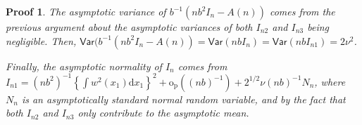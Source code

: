 \documentclass{article}
\newtheorem{Proof}{Proof}[section]
\begin{document}
\begin{Proof}
    The asymptotic variance of $b^{-1} (nb^2 I_n - A(n))$ comes from the previous argument about the asymptotic variances of both $I_{n2}$ and $I_{n3}$ being negligible. Then, $\mathsf{Var} (b^{-1} (nb^2 I_n - A(n)) = \mathsf{Var} (nb I_n) = \mathsf{Var} (nb I_{n1})  = 2 \nu^2$.

    Finally, the asymptotic normality of $I_n$ comes from $I_{n 1}=\left(n b^2\right)^{-1}\left\{\int w^2\left(x_1\right) \mathrm{d} x_1\right\}^2+\mathrm{o}_{\mathrm{p}}\left((n b)^{-1}\right)+2^{1 / 2} \nu(n b)^{-1} N_n$, where $N_n$ is an asymptotically standard normal random variable, and by the fact that both $I_{n2}$ and $I_{n3}$ only contribute to the asymptotic mean.
\end{Proof}




\end{document}
